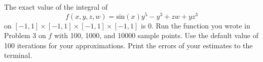 \begin{problem}
\label{prob:mc_test}
The exact value of the integral of
\[
f(x,y,z,w) = \text{sin}(x) y^5 -y^3 + zw + yz^3
\]
on $[-1,1]\times[-1,1]\times[-1,1]\times[-1,1]$ is 0.
Run the function  you wrote in Problem 3 on $f$ with 100, 1000, and 10000 sample points. Use the default value of 100 iterations for your approximations.
Print the errors of your estimates to the terminal.
\end{problem}

